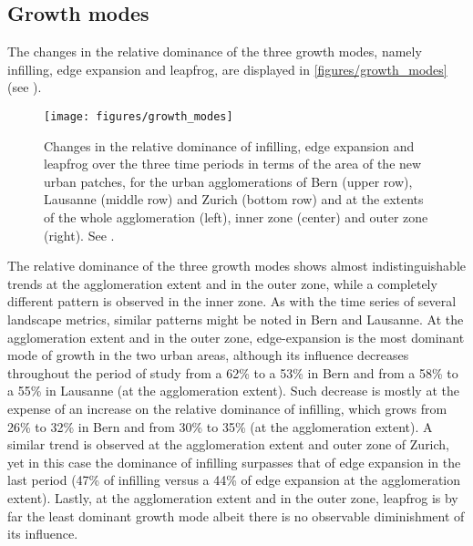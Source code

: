   
\subsection*{Growth modes}

The changes in the relative dominance of the three growth modes, namely infilling, edge expansion and leapfrog, are displayed in \autoref{figures/growth_modes} (see ).

\begin{figure}[!ht]
  \begin{adjustwidth}{0cm}{-.4\textwidth}
    \centering

    \texttt{[image: figures/growth\_modes]}
    
    \caption[Three growth modes]{\label{figures/growth_modes}Changes in the relative dominance of infilling, edge expansion and leapfrog over the three time periods in terms of the area of the new urban patches, for the urban agglomerations of Bern (upper row), Lausanne (middle row) and Zurich (bottom row) and at the extents of the whole agglomeration (left), inner zone (center) and outer zone (right). See .}
  \end{adjustwidth}
\end{figure}

The relative dominance of the three growth modes shows almost indistinguishable trends at the agglomeration extent and in the outer zone, while a completely different pattern is observed in the inner zone.
As with the time series of several landscape metrics, similar patterns might be noted in Bern and Lausanne. At the agglomeration extent and in the outer zone, edge-expansion is the most dominant mode of growth in the two urban areas, although its influence decreases throughout the period of study from a 62\% to a 53\% in Bern and from a 58\% to a 55\% in Lausanne (at the agglomeration extent). Such decrease is mostly at the expense of an increase on the relative dominance of infilling, which grows from 26\% to 32\% in Bern and from 30\% to 35\% (at the agglomeration extent).
A similar trend is observed at the agglomeration extent and outer zone of Zurich, yet in this case the dominance of infilling surpasses that of edge expansion in the last period (47\% of infilling versus a 44\% of edge expansion at the agglomeration extent).
Lastly, at the agglomeration extent and in the outer zone, leapfrog is by far the least dominant growth mode albeit there is no observable diminishment of its influence.

